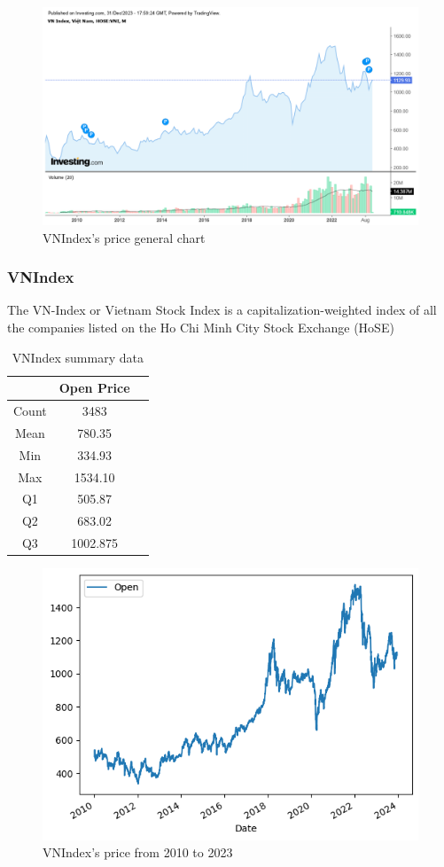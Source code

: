 \documentclass{ieeeojies}
\begin{document}
\begin{figure}[H]
    \centering
    \includegraphics[width=0.8\linewidth]{VNI.PNG}
    \caption{VNIndex's price general chart}
    \label{fig:example}
\end{figure}

\subsubsection{VNIndex}
The VN-Index or Vietnam Stock Index is a capitalization-weighted index of all the companies listed on the Ho Chi Minh City Stock Exchange (HoSE) \cite{e3}

\begin{table}[H]
    \centering
    \begin{tabular}{|c|c|c|}
        \hline
          &  Open Price  \\
        \hline
        Count & 3483  \\
        \hline
        Mean & 780.35  \\
        \hline
        Min & 334.93 \\
        \hline
        Max &  1534.10\\
        \hline
        Q1 &  505.87\\
        \hline
        Q2 &  683.02\\
        \hline
        Q3 &  1002.875\\
        \hline
    \end{tabular}
    \caption{VNIndex summary data}
    \label{table:example}
\end{table}

\begin{figure}[H]
    \centering
    \includegraphics[width=0.8\linewidth]{VNI1.PNG}
    \caption{VNIndex's price from 2010 to 2023}
    \label{fig:example}
\end{figure}
\end{document}
